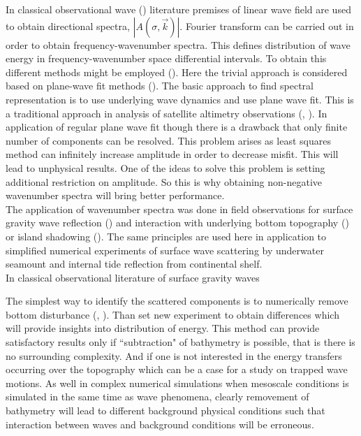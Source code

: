 In classical observational wave () literature premises of linear wave field are used to obtain directional spectra, $|A(\sigma, \vec{k})|$. Fourier transform can be carried out in order to obtain frequency-wavenumber spectra. This defines distribution of wave energy in frequency-wavenumber space differential intervals. To obtain this different methods might be employed (). Here the trivial approach is considered based on plane-wave fit methods (). The basic approach to find spectral representation is to use underlying wave dynamics and use plane wave fit. This is a traditional approach in analysis of satellite altimetry observations (\cite{ray2001estimates}, \cite{zhao2016global}). In application of regular plane wave fit though there is a drawback that only finite number of components can be resolved. This problem arises as least squares method can infinitely increase amplitude in order to decrease misfit. This will lead to unphysical results. One of the ideas to solve this problem is setting additional restriction on amplitude. So this is why obtaining non-negative wavenumber spectra will bring better performance.\\
The application of wavenumber spectra was done in field observations for surface gravity wave reflection (\cite{dickson1995wave}) and interaction with underlying bottom topography (\cite{thomson2005reflection}) or island shadowing (\cite{}). The same principles are used here in application to simplified numerical experiments of surface wave scattering by underwater seamount and internal tide reflection from continental shelf.\\




In classical observational literature of surface gravity waves 

The simplest way to identify the scattered components is to numerically remove bottom disturbance (\cite{kowalik2008kuril}, \cite{klymak2016reflection}). Than set new experiment to obtain differences which will provide insights into distribution of energy. This method can provide satisfactory results only if ``subtraction" of bathymetry is possible, that is there is no surrounding complexity. And if one is not interested in the energy transfers occurring over the topography which can be a case for a study on trapped wave motions. As well in complex numerical simulations when mesoscale conditions is simulated in the same time as wave phenomena, clearly removement of bathymetry will lead to different background physical conditions such that interaction between waves and background conditions will be erroneous.\\

